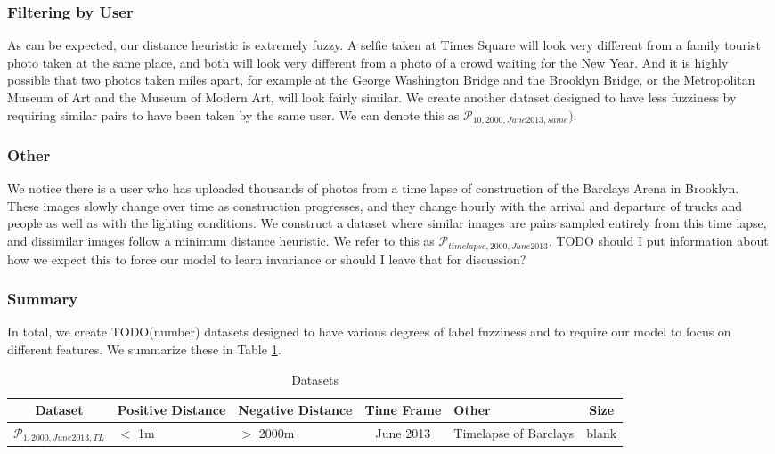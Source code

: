 \subsubsection{Filtering by User}
As can be expected, our distance heuristic is extremely fuzzy. A selfie taken at Times Square will look very different from a family tourist photo taken at the same place, and both will look very different from a photo of a crowd waiting for the New Year. And it is highly possible that two photos taken miles apart, for example at the George Washington Bridge and the Brooklyn Bridge, or the Metropolitan Museum of Art and the Museum of Modern Art, will look fairly similar. We create another dataset designed to have less fuzziness by requiring similar pairs to have been taken by the same user. We can denote this as $\mathcal{P}_{10,2000,June2013,same})$.

\subsubsection{Other}
We notice there is a user who has uploaded thousands of photos from a time lapse of construction of the Barclays Arena in Brooklyn. These images slowly change over time as construction progresses, and they change hourly with the arrival and departure of trucks and people as well as with the lighting conditions. We construct a dataset where similar images are pairs sampled entirely from this time lapse, and dissimilar images follow a minimum distance heuristic. We refer to this as $\mathcal{P}_{timelapse,2000,June2013}$. TODO should I put information about how we expect this to force our model to learn invariance or should I leave that for discussion?

\subsubsection{Summary}
In total, we create TODO(number) datasets designed to have various degrees of label fuzziness and to require our model to focus on different features. We summarize these in Table \ref{table:datasets}.

\begin{table}
	\centering
	\begin{tabular}{c >{\centering\arraybackslash}m{1.7cm} >{\centering\arraybackslash}m{1.7cm} c >{\centering\arraybackslash}m{2cm} c}
		\toprule
		\bfseries{Dataset} &  \bfseries Positive Distance & \bfseries Negative Distance & \bfseries Time Frame & \bfseries Other & \bfseries{Size}\\
		\midrule
		$\mathcal{P}_{1,2000,June2013,TL}$ & $<$ 1m & $>$ 2000m & June 2013 & Timelapse of Barclays & blank\\
		\bottomrule
	\end{tabular}
	\caption{Datasets}
	\label{table:datasets}
\end{table}



